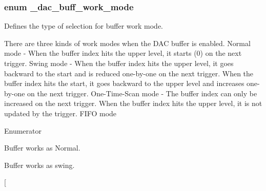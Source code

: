 \subsubsection[{\texorpdfstring{\+\_\+dac\+\_\+buff\+\_\+work\+\_\+mode}{_dac_buff_work_mode}}]{\setlength{\rightskip}{0pt plus 5cm}enum {\bf \+\_\+dac\+\_\+buff\+\_\+work\+\_\+mode}}\hypertarget{group__dac__hal_gaf2d8ceb9806aee0678374a5ca01aaae4}{}\label{group__dac__hal_gaf2d8ceb9806aee0678374a5ca01aaae4}


Defines the type of selection for buffer work mode. 

There are three kinds of work modes when the D\+AC buffer is enabled. Normal mode -\/ When the buffer index hits the upper level, it starts (0) on the next trigger. Swing mode -\/ When the buffer index hits the upper level, it goes backward to the start and is reduced one-\/by-\/one on the next trigger. When the buffer index hits the start, it goes backward to the upper level and increases one-\/by-\/one on the next trigger. One-\/\+Time-\/\+Scan mode -\/ The buffer index can only be increased on the next trigger. When the buffer index hits the upper level, it is not updated by the trigger. F\+I\+FO mode \begin{Desc}
\item[Enumerator]\par
\begin{description}
\item[{\em 
k\+Dac\+Buff\+Work\+As\+Normal\+Mode\hypertarget{group__dac__hal_ggaf2d8ceb9806aee0678374a5ca01aaae4aa2997592c55b3dbf49753be4e65cee77}{}\label{group__dac__hal_ggaf2d8ceb9806aee0678374a5ca01aaae4aa2997592c55b3dbf49753be4e65cee77}
}]Buffer works as Normal. \item[{\em 
k\+Dac\+Buff\+Work\+As\+Swing\+Mode\hypertarget{group__dac__hal_ggaf2d8ceb9806aee0678374a5ca01aaae4a3a3618062a2184fd97c7cbf8683701ca}{}\label{group__dac__hal_ggaf2d8ceb9806aee0678374a5ca01aaae4a3a3618062a2184fd97c7cbf8683701ca}
}]Buffer works as swing. \item[{\em 
}
\end{description}
\end{Desc}
